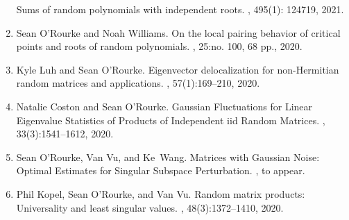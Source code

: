 \documentclass[letterpaper]{article}
\begin{document}
\begin{enumerate}
	\newblock Sums of random polynomials with independent roots.
	, 495(1): 124719, 2021.  
	\item Sean O'Rourke and Noah Williams.
	\newblock On the local pairing behavior of critical points and roots of random polynomials.
	, 25:no. 100, 68 pp., 2020.  
	\item Kyle Luh and Sean O'Rourke.
	\newblock Eigenvector delocalization for non-{H}ermitian random matrices and applications.
	, 57(1):169--210, 2020.  
	\item Natalie Coston and Sean O'Rourke.
	\newblock Gaussian {F}luctuations for {L}inear {E}igenvalue {S}tatistics of {P}roducts of {I}ndependent iid {R}andom {M}atrices.
	, 33(3):1541--1612, 2020.  
	\item Sean O'Rourke, Van Vu, and Ke~Wang.
	\newblock Matrices with Gaussian Noise: Optimal Estimates for Singular Subspace Perturbation. 
	, to appear.
	\item Phil Kopel, Sean O'Rourke, and Van Vu.
	\newblock Random matrix products: Universality and least singular values.
	, 48(3):1372--1410, 2020.

\end{enumerate}
\end{document}
